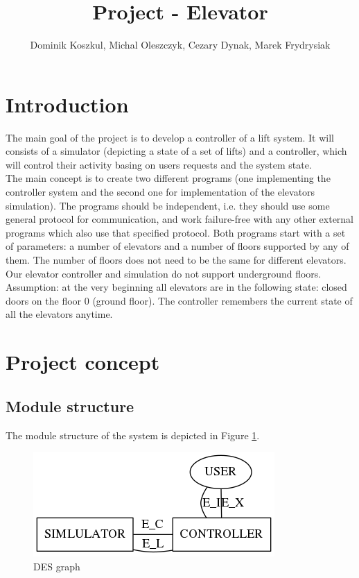 \documentclass[12pt]{article}
\title{Project - Elevator}
\author{Dominik Koszkul, Michal Oleszczyk, Cezary Dynak, Marek Frydrysiak }
\begin{document}
\maketitle{}


\section{Introduction}
The main goal of the project is to develop a controller of a lift system. It will consists of a simulator (depicting a state of a set of lifts) and a controller, which will control their activity basing on users requests and the system state.
\newline \\
The main concept is to create two different programs (one implementing the controller system and the second one for implementation of the elevators simulation). The programs should be independent, i.e. they should use some general protocol for communication, and work failure-free with any other external programs which also use that specified protocol. Both programs start with a set of parameters: a number of elevators and a number of floors supported by any of them. The number of floors does not need to be the same for different elevators. Our elevator controller and simulation do not support underground floors.
\newline
\newline
Assumption: at the very beginning all elevators are in the following state: closed doors on the floor 0 (ground floor). The controller remembers the current state of all the elevators anytime.

\section{Project concept}

\subsection{Module structure}

The module structure of the system is depicted in Figure \ref{fig:DES1}.

\begin{figure}[h!]
  \centering
  \includegraphics{img/simulator_controller.png}
  \caption{DES graph}
  \label{fig:DES1}
\end{figure}
\end{document}
